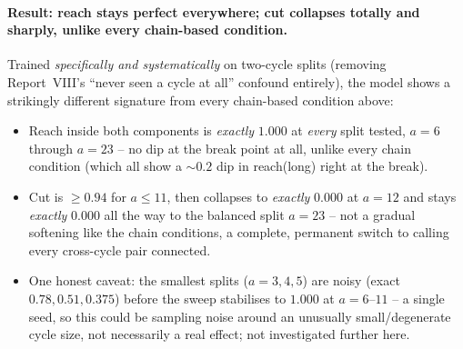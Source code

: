 \documentclass[11pt,a4paper]{article}
\begin{document}
\paragraph{Result: reach stays perfect everywhere; cut collapses totally and sharply, unlike
every chain-based condition.} Trained \emph{specifically and systematically} on two-cycle splits
(removing Report~VIII's ``never seen a cycle at all'' confound entirely), the model shows a
strikingly different signature from every chain-based condition above:

\begin{itemize}\setlength\itemsep{0.1em}
  \item Reach inside both components is \emph{exactly} $1.000$ at \emph{every} split tested,
        $a=6$ through $a=23$ -- no dip at the break point at all, unlike every chain condition
        (which all show a $\sim0.2$ dip in reach(long) right at the break).
  \item Cut is $\ge0.94$ for $a\le11$, then collapses to \emph{exactly} $0.000$ at $a=12$ and
        stays \emph{exactly} $0.000$ all the way to the balanced split $a=23$ -- not a gradual
        softening like the chain conditions, a complete, permanent switch to calling every
        cross-cycle pair connected.
  \item One honest caveat: the smallest splits ($a=3,4,5$) are noisy (exact $0.78, 0.51, 0.375$)
        before the sweep stabilises to $1.000$ at $a=6$--$11$ -- a single seed, so this could be
        sampling noise around an unusually small/degenerate cycle size, not necessarily a real
        effect; not investigated further here.
\end{itemize}
\end{document}
